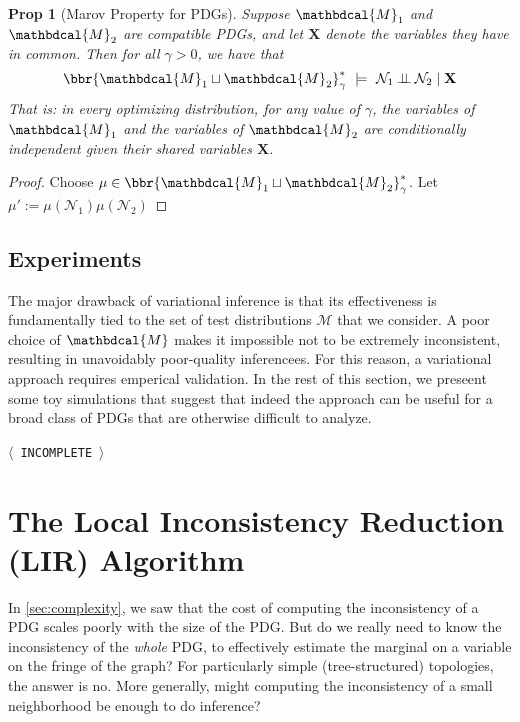 \documentclass{article}
\theoremstyle{plain}
\newtheorem{prop}[theorem]{Prop}
\theoremstyle{definition}
\theoremstyle{remark}
\newcommand{\TODO}[1][INCOMPLETE]{{\centering\Large\color{red}$\langle$~\texttt{#1}~$\rangle$\par}}
\newcommand\mat[1]{\mathbf{#1}}
\newcommand{\N}{\mathcal N}
\newcommand{\dg}[1]{\mathbdcal{#1}}
\newcommand{\bundle}{\mathbin{\sqcup}}
\begin{document}
\begin{prop}[Marov Property for PDGs]
	Suppose $\dg M_1$ and $\dg M_2$ are compatible PDGs, and let $\mathbf X$ denote the variables they have in common.
	Then for all $\gamma > 0$, we have that
	\[
	 	\bbr{\dg M_1 \bundle \dg M_2}^*_\gamma
			~\models~
		\N_1 \mathbin{\bot\!\!\!\bot} \N_2 \mid \mat X
	\]
	That is: in every optimizing distribution, for any value of $\gamma$, the variables of $\dg M_1$ and the variables of $\dg M_2$ are conditionally independent given their shared variables $\mat X$.

\end{prop}
\begin{proof}
	Choose $\mu \in \bbr{\dg M_1 \bundle \dg M_2}^*_\gamma$.
	Let $\mu' := \mu(\N_1) \mu(\N_2)$
\end{proof}


\subsection{Experiments}
	\label{sec:experiment-variational}

The major drawback of variational inference is that its effectiveness is fundamentally tied to the set of test distributions $\mathcal M$ that we consider.
A poor choice of $\dg M$ makes it impossible not to be extremely inconsistent, resulting in unavoidably poor-quality inferencees.
For this reason, a variational approach requires emperical validation. In the rest of this section, we preseent some toy simulations that suggest that indeed the approach can be useful for a broad class of PDGs that are otherwise difficult to analyze.

\TODO

\section{The Local Inconsistency Reduction (LIR) Algorithm}
% 

In \cref{sec:complexity}, we saw that the cost of computing the inconsistency of a PDG scales poorly with the size of the PDG.
But do we really need to know the inconsistency of the \emph{whole} PDG, to effectively estimate the marginal on a variable on the fringe of the graph? For particularly simple (tree-structured) topologies, the answer is no. More generally, might computing the inconsistency of a small neighborhood be enough to do inference?
\end{document}
